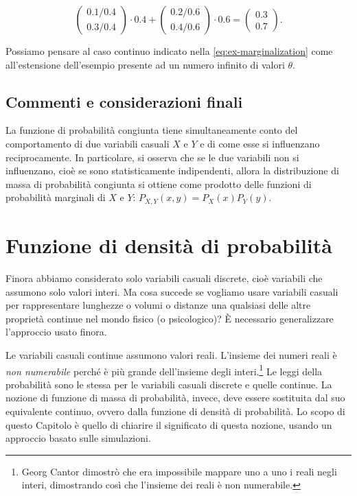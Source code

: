 \documentclass[
  11pt,
]{krantz}
\theoremstyle{definition}
\theoremstyle{definition}
\theoremstyle{definition}
\theoremstyle{definition}
\theoremstyle{remark}
\begin{document}
\[
\begin{pmatrix}
    0.1 / 0.4 \\
    0.3 / 0.4
\end{pmatrix} \cdot 0.4 +
\begin{pmatrix}
    0.2 / 0.6 \\
    0.4 / 0.6
\end{pmatrix} \cdot 0.6 =
\begin{pmatrix}
    0.3 \\
   0.7
\end{pmatrix}.
\]

Possiamo pensare al caso continuo indicato nella \eqref{eq:ex-marginalization} come all'estensione dell'esempio presente ad un numero infinito di valori \(\theta\).

\hypertarget{commenti-e-considerazioni-finali-3}{%
\section*{Commenti e considerazioni finali}\label{commenti-e-considerazioni-finali-3}}


La funzione di probabilità congiunta tiene simultaneamente conto del comportamento di due variabili casuali \(X\) e \(Y\) e di come esse si influenzano reciprocamente. In particolare, si osserva che se le due variabili non si influenzano, cioè se sono statisticamente indipendenti, allora la distribuzione di massa di probabilità congiunta si ottiene come prodotto delle funzioni di probabilità marginali di \(X\) e \(Y\): \(P_{X, Y}(x, y) = P_X(x) P_Y(y)\).

\hypertarget{chapter-intro-density-function}{%
\chapter{Funzione di densità di probabilità}\label{chapter-intro-density-function}}

Finora abbiamo considerato solo variabili casuali discrete, cioè variabili che assumono solo valori interi. Ma cosa succede se vogliamo usare variabili casuali per rappresentare lunghezze o volumi o distanze una qualsiasi delle altre proprietà continue nel mondo fisico (o psicologico)? È necessario generalizzare l'approccio usato finora.

Le variabili casuali continue assumono valori reali. L'insieme dei numeri reali è \emph{non numerabile} perché è più grande dell'insieme degli interi.\footnote{Georg Cantor dimostrò che era impossibile mappare uno a uno i reali negli interi, dimostrando così che l'insieme dei reali è non numerabile.} Le leggi della probabilità sono le stessa per le variabili casuali discrete e quelle continue. La nozione di funzione di massa di probabilità, invece, deve essere sostituita dal suo equivalente continuo, ovvero dalla funzione di densità di probabilità. Lo scopo di questo Capitolo è quello di chiarire il significato di questa nozione, usando un approccio basato sulle simulazioni.
\end{document}
